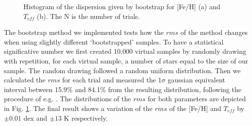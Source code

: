 \documentclass{aa}
\begin{document}
\begin{figure}[]
\begin{center}
\end{center}
\caption{Histogram of the dispersion given by bootstrap for [Fe/H] (a) and $T_{eff}$ (b). The N is the number of trials.}
\label{fig:strap}
\end{figure}


The bootstrap method we implemented tests how the $rms$ of the method changes when using slightly different `bootstrapped' samples. To have a statistical significative number we first created 10.000 virtual samples by randomly drawing with repetition, for each virtual sample, a number of stars equal to the size of our sample. The random drawing followed a random uniform distribution. Then we calculated the $rms$ for each trial and measured the $1\sigma$ gaussian equivalent interval between 15.9\% and 84.1\% from the resulting distribution, following the procedure of e.g. \citet{Burgasser-2003,Neves-2013}. The distributions of the $rms$ for both parameters are depicted in Fig. \ref{fig:strap}. The final result shows a variation of the $rms$ of the [Fe/H] and $T_{eff}$ by  $\pm 0.01$ dex and $\pm 13$ K respectively.
\end{document}
